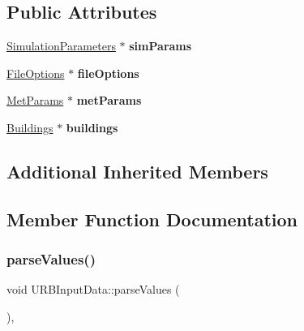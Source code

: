 \subsection*{Public Attributes}
\begin{DoxyCompactItemize}
\item 
\mbox{\label{classURBInputData_acf42beaabf93d0d6fd3b0837848bf159}} 
\hyperlink{classSimulationParameters}{Simulation\+Parameters} $\ast$ {\bfseries sim\+Params}
\item 
\mbox{\label{classURBInputData_a33d069c2768f3aa4611418882b89cae2}} 
\hyperlink{classFileOptions}{File\+Options} $\ast$ {\bfseries file\+Options}
\item 
\mbox{\label{classURBInputData_a25b7c100a2265dd5d2bb8212a35d4e5b}} 
\hyperlink{classMetParams}{Met\+Params} $\ast$ {\bfseries met\+Params}
\item 
\mbox{\label{classURBInputData_abe9776ac2268dc4783e29e90e9c70ff3}} 
\hyperlink{classBuildings}{Buildings} $\ast$ {\bfseries buildings}
\end{DoxyCompactItemize}
\subsection*{Additional Inherited Members}


\subsection{Member Function Documentation}
\mbox{\label{classURBInputData_a3fea38ec8d574eb8e5c9ee5f1ad53636}} 
\subsubsection{\texorpdfstring{parse\+Values()}{parseValues()}}
{\footnotesize\ttfamily void U\+R\+B\+Input\+Data\+::parse\+Values (\begin{DoxyParamCaption}{ }\end{DoxyParamCaption})\hspace{0.3cm}{\ttfamily [inline]}, {\ttfamily [virtual]}}

